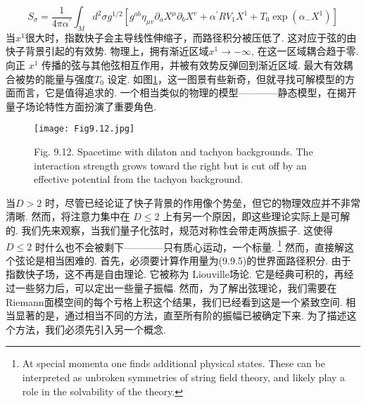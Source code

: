 \begin{equation}
	S_{\sigma}=\frac{1}{4 \pi \alpha^{\prime}} \int_{M} d^{2} \sigma g^{1 / 2}\left[g^{a b} \eta_{\mu v} \partial_{a} X^{\mu} \partial_{b} X^{v}+\alpha^{\prime} R V_{1} X^{1}+T_{0} \exp \left(\alpha_{-} X^{1}\right)\right]
\end{equation}
当$x^{1}$很大时，指数快子会主导线性伸缩子，而路径积分被压低了. 这对应于弦的由快子背景引起的有效势. 物理上，拥有渐近区域$x^{1} \rightarrow-\infty$, 在这一区域耦合趋于零. 向正 $x^{1}$ 传播的弦与其他弦相互作用，并被有效势反弹回到渐近区域. 最大有效耦合被势的能量与强度$T_{0}$ 设定. 如图\ref{Fig9.12}，这一图景有些新奇，但就寻找可解模型的方面而言，它是值得追求的. 一个相当类似的物理的模型————静态模型，在揭开量子场论特性方面扮演了重要角色.

\begin{figure}
	\begin{center}
		\texttt{[image: Fig9.12.jpg]}\\
		\caption{Fig. 9.12. Spacetime with dilaton and tachyon backgrounds. The interaction strength grows toward the right but is cut off by an effective potential from the tachyon background.}\label{Fig9.12}
	\end{center}
\end{figure}

当$D>2$ 时，尽管已经论证了快子背景的作用像个势垒，但它的物理效应并不非常清晰. 然而，将注意力集中在 $D \leq 2$ 上有另一个原因，即这些理论实际上是可解的. 我们先来观察，当我们量子化弦时，规范对称性会带走两族振子. 这使得 $D \leq 2$ 时什么也不会被剩下————只有质心运动，一个标量. 
\footnote{ At special momenta one finds additional physical states. These can be interpreted as unbroken symmetries of string field theory, and likely play a role in the solvability of the theory. }
然而，直接解这个弦论是相当困难的. 首先，必须要计算作用量为(9.9.5)的世界面路径积分. 由于指数快子场，这不再是自由理论. 它被称为 Liouville场论. 它是经典可积的，再经过一些努力后，可以定出一些量子振幅. 然而，为了解出弦理论，我们需要在Riemann面模空间的每个亏格上积这个结果，我们已经看到这是一个紧致空间. 相当显著的是，通过相当不同的方法，直至所有阶的振幅已被确定下来. 为了描述这个方法，我们必须先引入另一个概念.

